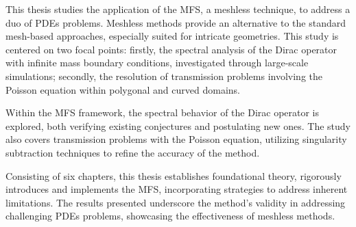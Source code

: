 \acresetall
\noindent
This thesis studies the application of the \ac{MFS}, a meshless technique, to address a duo of \acp{PDE} problems. Meshless methods provide an alternative to the standard mesh-based approaches, especially suited for intricate geometries. This study is centered on two focal points: firstly, the spectral analysis of the Dirac operator with infinite mass boundary conditions, investigated through large-scale simulations; secondly, the resolution of transmission problems involving the Poisson equation within polygonal and curved domains.

Within the \ac{MFS} framework, the spectral behavior of the Dirac operator is explored, both verifying existing conjectures and postulating new ones. The study also covers transmission problems with the Poisson equation, utilizing singularity subtraction techniques to refine the accuracy of the method.

Consisting of six chapters, this thesis establishes foundational theory, rigorously introduces and implements the \ac{MFS}, incorporating strategies to address inherent limitations. The results presented underscore the method's validity in addressing challenging \acp{PDE} problems, showcasing the effectiveness of meshless methods.